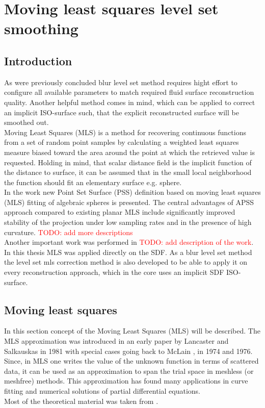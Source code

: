 \chapter{Moving least squares level set smoothing}
\section{Introduction}
As were previously concluded blur level set method requires hight effort to configure all available parameters to match required fluid surface reconstruction quality. Another helpful method comes in mind, which can be applied to correct an implicit ISO-surface such, that the explicit reconstructed surface will be smoothed out.\\
Moving Least Squares (MLS) is a method for recovering continuous functions from a set of random point samples by calculating a weighted least squares measure biased toward the area around the point at which the retrieved value is requested. Holding in mind, that scalar distance field is the implicit function of the distance to surface, it can be assumed that in the small local neighborhood the function should fit an elementary surface e.g. sphere.\\
In the work \cite{Apss} new Point Set Surface (PSS) definition based on moving least squares (MLS) fitting of algebraic spheres is presented. The central advantages of APSS approach compared to existing planar MLS include significantly improved stability of the projection under low sampling rates and in the presence of high curvature. \textcolor{red}{TODO: add more descriptions}\\
Another important work was performed in \cite{PssLkr} \textcolor{red}{TODO: add description of the work}.\\
In this thesis MLS was applied directly on the SDF. As a blur level set method the level set mls correction method is also developed to be able to apply it on every reconstruction approach, which in the core uses an implicit SDF ISO-surface.  
\section{Moving least squares}
In this section concept of the Moving Least Squares (MLS) will be described. The MLS approximation was introduced in an early paper by Lancaster and Salkauskas  \cite{MLSSalkauskas} in 1981 with special cases going back to McLain  \cite{MLSMcLain1}, \cite{MLSMcLain2} in 1974 and 1976. Since, in MLS one writes the value of the unknown function in terms of scattered data, it can be used as an approximation to span the trial space in meshless (or meshfree) methods. This approximation has found many applications in curve fitting and numerical solutions of partial differential equations.\\
Most of the theoretical material was taken from \cite{MLSIntro}.

